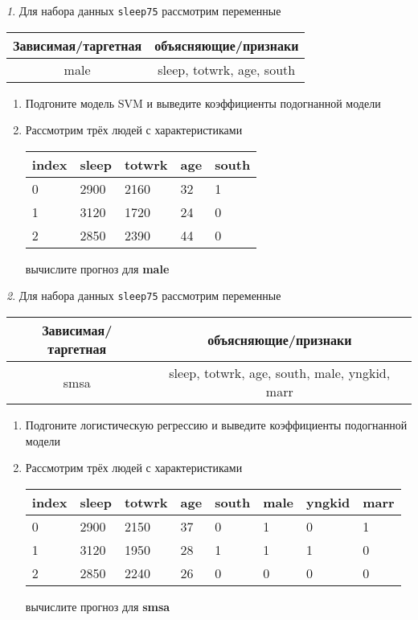 \documentclass[12pt]{article}
\theoremstyle{remark}
\newtheorem{exercise}{}[section]
\begin{document}
\begin{exercise}
Для набора данных \texttt{sleep75} рассмотрим переменные

\begin{center}
	\begin{tabular}{|c|c|} \hline
		Зависимая/таргетная & объясняющие/признаки \\ \hline
		male & sleep, totwrk, age, south \\ \hline
	\end{tabular}
\end{center}

\begin{enumerate}
	\item Подгоните модель SVM и выведите коэффициенты подогнанной модели
	\item Рассмотрим трёх людей с характеристиками
	\begin{center}
		\begin{tabular}{|l||l|l|l|l|}\hline
			index & sleep & totwrk & age & south  \\ \hline\hline
			0 & 2900 & 2160 & 32 & 1  \\
			1 & 3120 & 1720 & 24 & 0  \\
			2 & 2850 & 2390 & 44 & 0  \\ \hline
		\end{tabular}
	\end{center}
	вычислите прогноз для \textbf{male} 
\end{enumerate}
\end{exercise}

\begin{exercise}
Для набора данных \texttt{sleep75} рассмотрим переменные
\begin{center}
	\begin{tabular}{|c|c|} \hline
		Зависимая/таргетная & объясняющие/признаки \\ \hline
		smsa & sleep, totwrk, age, south, male, yngkid, marr \\ \hline
	\end{tabular}
\end{center}
\begin{enumerate}
	\item Подгоните логистическую регрессию и выведите коэффициенты подогнанной модели
	\item Рассмотрим трёх людей с характеристиками
	\begin{center}
		\begin{tabular}{|l||l|l|l|l|l|l|l|}\hline
			index & sleep & totwrk & age & south & male & yngkid & marr \\ \hline\hline
			0 & 2900 & 2150 & 37 & 0 & 1 &  0 & 1 \\
			1 & 3120 & 1950 & 28 & 1 & 1 &  1 & 0 \\
			2 & 2850 & 2240 & 26 & 0 & 0 &  0 & 0 \\ \hline
		\end{tabular}
	\end{center}
	вычислите прогноз для \textbf{smsa} 
\end{enumerate}
\end{exercise}
\end{document}
